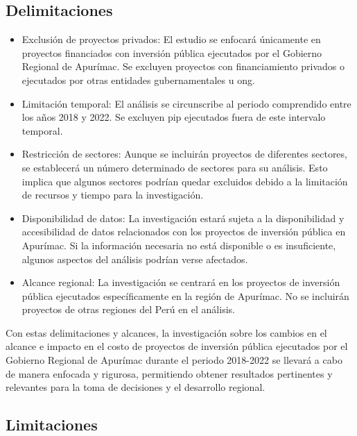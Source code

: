 \subsection{Delimitaciones}
\begin{itemize}
	\item Exclusión de proyectos privados: El estudio se enfocará únicamente en proyectos financiados con inversión pública ejecutados por el Gobierno Regional de Apurímac. Se excluyen proyectos con financiamiento privados o ejecutados por otras entidades gubernamentales u \gls{ong}.

	\item Limitación temporal: El análisis se circunscribe al periodo comprendido entre los años 2018 y 2022. Se excluyen \gls{pip} ejecutados fuera de este intervalo temporal.
	\item Restricción de sectores: Aunque se incluirán proyectos de diferentes sectores, se establecerá un número determinado de sectores para su análisis. Esto implica que algunos sectores podrían quedar excluidos debido a la limitación de recursos y tiempo para la investigación.
	\item Disponibilidad de datos: La investigación estará sujeta a la disponibilidad y accesibilidad de datos relacionados con los proyectos de inversión pública en Apurímac. Si la información necesaria no está disponible o es insuficiente, algunos aspectos del análisis podrían verse afectados.
	\item Alcance regional: La investigación se centrará en los proyectos de inversión pública ejecutados específicamente en la región de Apurímac. No se incluirán proyectos de otras regiones del Perú en el análisis.

\end{itemize}
Con estas delimitaciones y alcances, la investigación sobre los cambios en el alcance e impacto en el costo de proyectos de inversión pública ejecutados por el Gobierno Regional de Apurímac durante el periodo 2018-2022 se llevará a cabo de manera enfocada y rigurosa, permitiendo obtener resultados pertinentes y relevantes para la toma de decisiones y el desarrollo regional.

\subsection{Limitaciones}

